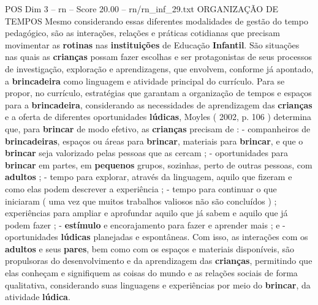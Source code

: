 \begin{textsample}{POS Dim 3 – rn – Score 20.00 – rn/rn\_inf\_29.txt}  \label{ex:f3_pos_097}
ORGANIZAÇÃO DE TEMPOS Mesmo considerando essas diferentes modalidades de gestão do tempo pedagógico, são as interações, relações e práticas cotidianas que precisam movimentar as \textbf{rotinas} nas \textbf{instituições} de Educação \textbf{Infantil}.
São situações nas quais as \textbf{crianças} possam fazer escolhas e ser protagonistas de seus processos de investigação, exploração e aprendizagens, que envolvem, conforme já apontado, a \textbf{brincadeira} como linguagem e atividade principal do currículo.
Para se propor, no currículo, estratégias que garantam a organização de tempos e espaços para a \textbf{brincadeira}, considerando as necessidades de aprendizagem das \textbf{crianças} e a oferta de diferentes oportunidades \textbf{lúdicas}, Moyles ( 2002, p. 106 ) determina que, para \textbf{brincar} de modo efetivo, as \textbf{crianças} precisam de : - companheiros de \textbf{brincadeiras}, espaços ou áreas para \textbf{brincar}, materiais para \textbf{brincar}, e que o \textbf{brincar} seja valorizado pelas pessoas que as cercam ; - oportunidades para \textbf{brincar} em partes, em \textbf{pequenos} grupos, sozinhas, perto de outras pessoas, com \textbf{adultos} ; - tempo para explorar, através da linguagem, aquilo que fizeram e como elas podem descrever a experiência ; - tempo para continuar o que iniciaram ( uma vez que muitos trabalhos valiosos não são concluídos ) ; experiências para ampliar e aprofundar aquilo que já sabem e aquilo que já podem fazer ; - \textbf{estímulo} e encorajamento para fazer e aprender mais ; e - oportunidades \textbf{lúdicas} planejadas e espontâneas.
Com isso, as interações com os \textbf{adultos} e seus \textbf{pares}, bem como com os espaços e materiais disponíveis, são propulsoras do desenvolvimento e da aprendizagem das \textbf{crianças}, permitindo que elas conheçam e signifiquem as coisas do mundo e as relações sociais de forma qualitativa, considerando suas linguagens e experiências por meio do \textbf{brincar}, da atividade \textbf{lúdica}.

\end{textsample}
